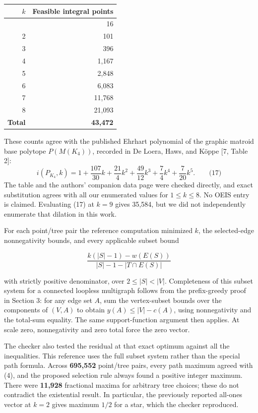 \documentclass{article}
\begin{document}
\begin{longtable}[]{@{}rr@{}}
\toprule
\(k\) & Feasible integral points \\
\midrule
\endhead
\bottomrule
\endlastfoot
1 & 16 \\
2 & 101 \\
3 & 396 \\
4 & 1,167 \\
5 & 2,848 \\
6 & 6,083 \\
7 & 11,768 \\
8 & 21,093 \\
\textbf{Total} & \textbf{43,472} \\
\end{longtable}

These counts agree with the published Ehrhart polynomial of the graphic matroid base polytope \(P(M(K_4))\), recorded in De Loera, Haws, and Köppe [7, Table 2]: \[
i(P_{K_4},k)=1+\frac{107}{30}k+\frac{21}{4}k^2+
\frac{49}{12}k^3+\frac74k^4+\frac7{20}k^5.\qquad\text{(17)}
\] The table and the authors' companion data page were checked directly, and exact substitution agrees with all our enumerated values for \(1\le k\le8\). No OEIS entry is claimed. Evaluating (17) at \(k=9\) gives 35,584, but we did not independently enumerate that dilation in this work.

For each point/tree pair the reference computation minimized \(k\), the selected-edge nonnegativity bounds, and every applicable subset bound

\[
\frac{k(|S|-1)-w(E(S))}{|S|-1-|T\cap E(S)|}
\]

with strictly positive denominator, over \(2\le|S|\lt |V|\). Completeness of this subset system for a connected loopless multigraph follows from the prefix-greedy proof in Section 3: for any edge set \(A\), sum the vertex-subset bounds over the components of \((V,A)\) to obtain \(y(A)\le |V|-c(A)\), using nonnegativity and the total-sum equality. The same support-function argument then applies. At scale zero, nonnegativity and zero total force the zero vector.

The checker also tested the residual at that exact optimum against all the inequalities. This reference uses the full subset system rather than the special path formula. Across \textbf{695,552} point/tree pairs, every path maximum agreed with (4), and the proposed selection rule always found a positive integer maximum. There were \textbf{11,928} fractional maxima for arbitrary tree choices; these do not contradict the existential result. In particular, the previously reported all-ones vector at \(k=2\) gives maximum \(1/2\) for a star, which the checker reproduced.
\end{document}
